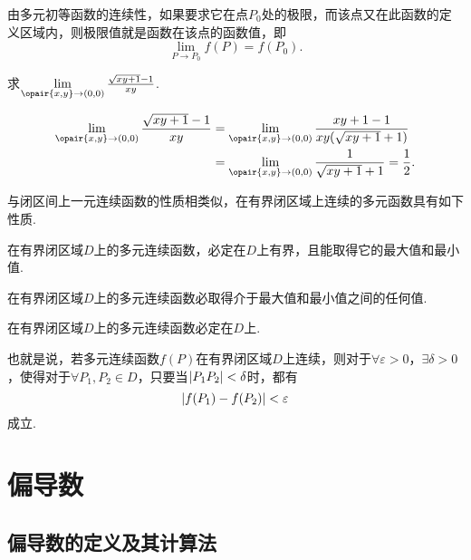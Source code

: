 由多元初等函数的连续性，如果要求它在点\(P_0\)处的极限，而该点又在此函数的定义区域内，则极限值就是函数在该点的函数值，即\[
\lim\limits_{P \to P_0} f(P) = f(P_0).
\]

\begin{example}
\def\l{\lim\limits_{\opair{x,y}\to(0,0)}}
求\(\l \frac{\sqrt{xy+1}-1}{xy}\).
\begin{solution}
\[\begin{split}
\l \frac{\sqrt{xy+1}-1}{xy}
&= \l \frac{xy+1-1}{xy(\sqrt{xy+1}+1)} \\
&= \l \frac{1}{\sqrt{xy+1}+1}
= \frac{1}{2}.
\end{split}\]
\end{solution}
\end{example}

与闭区间上一元连续函数的性质相类似，在有界闭区域上连续的多元函数具有如下性质.

\begin{property}[有界性与最值定理]\label{theorem:多元函数微分法.有界性与最值定理}
在有界闭区域\(D\)上的多元连续函数，必定在\(D\)上有界，且能取得它的最大值和最小值.
\end{property}

\begin{property}[介值定理]\label{theorem:多元函数微分法.介值定理}
在有界闭区域\(D\)上的多元连续函数必取得介于最大值和最小值之间的任何值.
\end{property}

\begin{property}[一致连续性定理]\label{theorem:多元函数微分法.一致连续性定理}
在有界闭区域\(D\)上的多元连续函数必定在\(D\)上.

也就是说，若多元连续函数\(f(P)\)在有界闭区域\(D\)上连续，则对于\(\forall \varepsilon > 0\)，\(\exists \delta > 0\)，使得对于\(\forall P_1,P_2 \in D\)，只要当\(\abs{P_1P_2}<\delta\)时，都有\[
\abs{f(P_1)-f(P_2)} < \varepsilon
\]成立.
\end{property}

\section{偏导数}
\subsection{偏导数的定义及其计算法}
